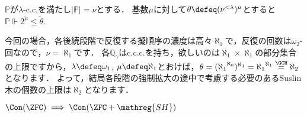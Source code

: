 \documentclass[a4j]{ltjsarticle}
\newcommand{\SH}{\mathreg{SH}}
\begin{document}
\begin{lemma}
 $\mathbb{P}$が$\lambda$-c.c.を満たし$|\mathbb{P}| = \nu$とする．
 基数$\mu$に対して$\theta \defeq (\nu^{<\lambda})^\mu$とすると$\mathbb{P} \Vdash 2^{\check{\mu}} \leq \check{\theta}$.
\end{lemma}

今回の場合，各後続段階で反復する擬順序の濃度は高々$\aleph_1$で，反復の回数は$\omega_2$-回なので，$\nu = \aleph_1$です．
各$\mathbb{Q}_\gamma$はc.c.c.を持ち，欲しいのは$\aleph_1 \times \aleph_1$の部分集合の上限ですから，$\lambda \defeq \omega_1$, $\mu \defeq \aleph_1$とおけば，$\theta = ({\aleph_1}^{\aleph_0})^{\aleph_1} = {\aleph_1}^{\aleph_1} \overset{\GCH}{=} \aleph_2$となります．
よって，結局各段階の強制拡大の途中で考慮する必要のあるSuslin木の個数の上限は$\aleph_2$となります．

\begin{theorem}
 $\Con(\ZFC) \implies \Con(\ZFC+\SH)$
\end{theorem}
\end{document}
